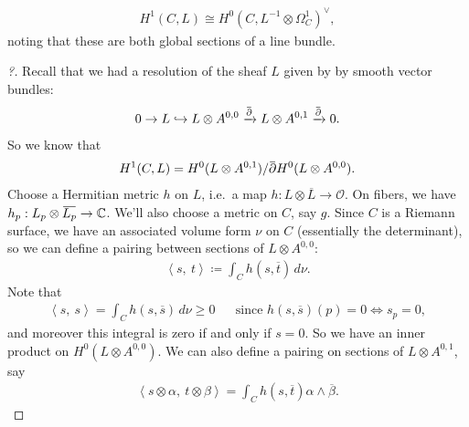 \begin{proposition}

\begin{align*}
H^1(C, L) \cong H^0(C, L ^{-1} \otimes\Omega_C^1)^\vee
,\end{align*}
noting that these are both global sections of a line bundle.

\end{proposition}

\begin{proof}[?]

Recall that we had a resolution of the sheaf \(L\) given by by smooth
vector bundles:
\begin{align*}
0 \to L \hookrightarrow L\otimes A^{0, 0} \xrightarrow{\mkern 1.5mu\overline{\mkern-1.5mu{\partial}\mkern-1.5mu}\mkern 1.5mu} L \otimes A^{0, 1} \xrightarrow{\mkern 1.5mu\overline{\mkern-1.5mu{\partial}\mkern-1.5mu}\mkern 1.5mu} 0
.\end{align*}
So we know that
\begin{align*}
H^1(C, L) = H^0(L\otimes A^{0, 1}) / \mkern 1.5mu\overline{\mkern-1.5mu{\partial}\mkern-1.5mu}\mkern 1.5muH^0(L\otimes A^{0, 0})
.\end{align*}
Choose a Hermitian metric \(h\) on \(L\), i.e.~a map
\(h: L\otimes{\overline{{L}}} \to {\mathcal{O}}\). On fibers, we have
\(h_p: L_p \otimes\mkern 1.5mu\overline{\mkern-1.5mu L_p \mkern-1.5mu}\mkern 1.5mu \to {\mathbb{C}}\).
We'll also choose a metric on \(C\), say \(g\). Since \(C\) is a Riemann
surface, we have an associated volume form \(\nu\) on \(C\) (essentially
the determinant), so we can define a pairing between sections of
\(L\otimes A^{0, 0}\):
\begin{align*}
{\left\langle {s},~{t} \right\rangle} \coloneqq\int_C h(s, {\overline{{t}}} ) \,d\nu
.\end{align*}
Note that
\begin{align*}
{\left\langle {s},~{s} \right\rangle} = \int_C h(s, {\overline{{s}}}) \,d\nu \geq 0
&& \text{since }
h(s, {\overline{{s}}})(p) = 0 \iff s_p = 0
,\end{align*}
and moreover this integral is zero if and only if \(s=0\). So we have an
inner product on \(H^0(L\otimes A^{0, 0})\). We can also define a
pairing on sections of \(L\otimes A^{0, 1}\), say
\begin{align*}
{\left\langle { s \otimes \alpha},~{ t \otimes \beta} \right\rangle} = \int_C h(s, {\overline{{t}}}) \alpha\wedge {\overline{{\beta}}}
.\end{align*}

\end{proof}
